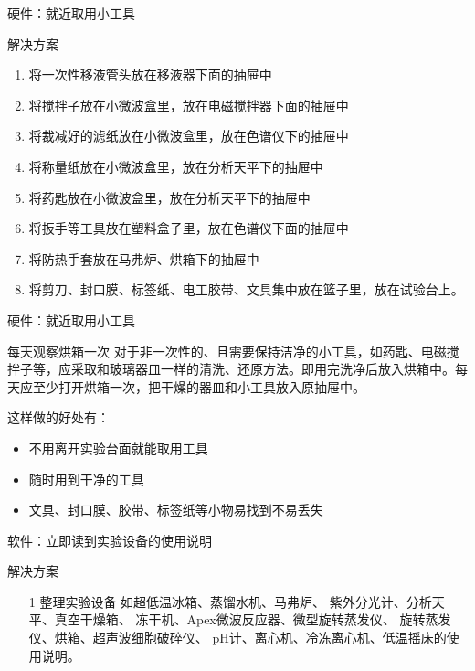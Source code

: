 \documentclass[CJKutf8]{beamer}
\newenvironment{SC}{%
  \CJKfamily{gbsn}%
  \CJKtilde
  \CJKnospace}{}
\begin{document}
\begin{CJK}{UTF8}{}
\begin{SC}
\begin{frame}{硬件：就近取用小工具}
  \begin{block}{解决方案}
    \begin{enumerate}
    \item 将一次性移液管头放在移液器下面的抽屉中
    \item 将搅拌子放在小微波盒里，放在电磁搅拌器下面的抽屉中
    \item 将裁减好的滤纸放在小微波盒里，放在色谱仪下的抽屉中
    \item 将称量纸放在小微波盒里，放在分析天平下的抽屉中
    \item 将药匙放在小微波盒里，放在分析天平下的抽屉中
    \item 将扳手等工具放在塑料盒子里，放在色谱仪下面的抽屉中
    \item 将防热手套放在马弗炉、烘箱下的抽屉中
    \item 将剪刀、封口膜、标签纸、电工胶带、文具集中放在篮子里，放在试验台上。
    \end{enumerate}
  \end{block}
\end{frame}
%
\begin{frame}{硬件：就近取用小工具}
  \begin{block}{每天观察烘箱一次}
  对于非一次性的、且需要保持洁净的小工具，如药匙、电磁搅拌子等，应采取和玻璃器皿一样的清洗、还原方法。即用完洗净后放入烘箱中。每天应至少打开烘箱一次，把干燥的器皿和小工具放入原抽屉中。
  \end{block}
  这样做的好处有：
  \begin{itemize}
  \item 不用离开实验台面就能取用工具
  \pause
  \item 随时用到干净的工具
  \pause
  \item 文具、封口膜、胶带、标签纸等小物易找到不易丢失
  \end{itemize}
\end{frame}

\begin{frame}{软件：立即读到实验设备的使用说明}
  \begin{block}{解决方案}
    \begin{enumerate}
    \item[1] 整理实验设备
    如超低温冰箱、蒸馏水机、马弗炉、
    紫外分光计、分析天平、真空干燥箱、
    冻干机、Apex微波反应器、微型旋转蒸发仪、
    旋转蒸发仪、烘箱、超声波细胞破碎仪、
    pH计、离心机、冷冻离心机、低温摇床的使用说明。
    \end{enumerate}
  \end{block}
\end{frame}


\end{SC}
\end{CJK}
\end{document}
